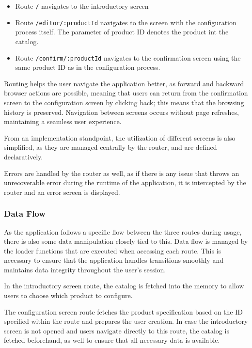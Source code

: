 \begin{itemize}[label=\rectanglebullet]
    \item Route \texttt{/} navigates to the introductory screen
    \item Route \texttt{/editor/:productId} navigates to the screen with the configuration process itself. The parameter of product ID denotes the product int the catalog.
    \item Route \texttt{/confirm/:productId} navigates to the confirmation screen using the same product ID as in the configuration process.
\end{itemize}

Routing helps the user navigate the application better, as forward and backward browser actions are possible, meaning that users can return from the confirmation screen to the configuration screen by clicking back; this means that the browsing history is preserved. Navigation between screens occurs without page refreshes, maintaining a seamless user experience.

From an implementation standpoint, the utilization of different screens is also simplified, as they are managed centrally by the router, and are defined declaratively. 

Errors are handled by the router as well, as if there is any issue that throws an unrecoverable error during the runtime of the application, it is intercepted by the router and an error screen is displayed.


\subsubsection{Data Flow}

As the application follows a specific flow between the three routes during usage, there is also some data manipulation closely tied to this. Data flow is managed by the loader functions that are executed when accessing each route. This is necessary to ensure that the application handles transitions smoothly and maintains data integrity throughout the user's session.

In the introductory screen route, the catalog is fetched into the memory to allow users to choose which product to configure.

The configuration screen route fetches the product specification based on the ID specified within the route and prepares the user creation. In case the introductory screen is not opened and users navigate directly to this route, the catalog is fetched beforehand, as well to ensure that all necessary data is available.

